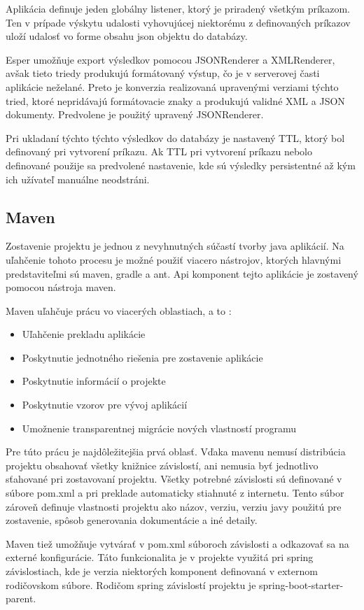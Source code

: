 		Aplikácia definuje jeden globálny listener, ktorý je priradený všetkým príkazom. Ten v prípade výskytu udalosti vyhovujúcej niektorému z definovaných príkazov uloží udalosť vo forme obsahu json objektu do databázy.
		
		Esper umožňuje export výsledkov pomocou JSONRenderer a XMLRenderer, avšak tieto triedy produkujú formátovaný výstup, čo je v serverovej časti aplikácie neželané. Preto je konverzia realizovaná upravenými verziami týchto tried, ktoré nepridávajú formátovacie znaky a produkujú validné XML a JSON dokumenty. Predvolene je použitý upravený JSONRenderer.
		
		Pri ukladaní týchto týchto výsledkov do databázy je nastavený TTL, ktorý bol definovaný pri vytvorení príkazu. Ak TTL pri vytvorení príkazu nebolo definované použije sa predvolené nastavenie, kde sú výsledky persistentné až kým ich užívateľ manuálne neodstráni.

	\subsection{Maven}
		Zostavenie projektu je jednou z nevyhnutných súčastí tvorby java aplikácií. Na uľahčenie tohoto procesu je možné použiť viacero nástrojov, ktorých hlavnými predstaviteľmi sú maven, gradle a ant. Api komponent tejto aplikácie je zostavený pomocou nástroja maven. 
		
		Maven uľahčuje prácu vo viacerých oblastiach, a to \cite{web:maven-doc}:
		\begin{itemize}
			\item Uľahčenie prekladu aplikácie
			\item Poskytnutie jednotného riešenia pre zostavenie aplikácie
			\item Poskytnutie informácií o projekte
			\item Poskytnutie vzorov pre vývoj aplikácií
			\item Umožnenie transparentnej migrácie nových vlastností programu
		\end{itemize}
		Pre túto prácu je najdôležitejšia prvá oblasť. Vďaka mavenu nemusí distribúcia projektu obsahovať všetky knižnice závislostí, ani nemusia byť jednotlivo sťahované pri zostavovaní projektu. Všetky potrebné závislosti sú definované v súbore pom.xml a pri preklade automaticky stiahnuté z internetu. Tento súbor zároveň definuje vlastnosti projektu ako názov, verziu, verziu javy použitú pre zostavenie, spôsob generovania dokumentácie a iné detaily.
		
		Maven tiež umožňuje vytvárať v pom.xml súboroch závislosti a odkazovať sa na externé konfigurácie. Táto funkcionalita je v projekte využitá pri spring závislostiach, kde je verzia niektorých komponent definovaná v externom rodičovskom súbore. Rodičom spring závislostí projektu je spring-boot-starter-parent.
		
